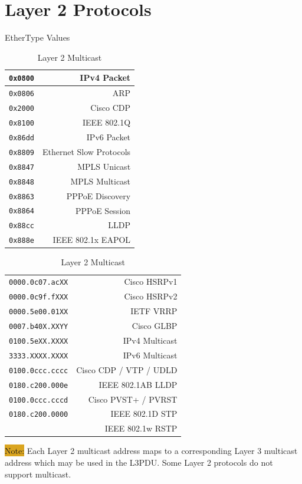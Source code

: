 \documentclass[12pt]{article}
\newcommand{\note}[1]{\colorbox{#1}{Note:}}
\begin{document}
\section{Layer 2 Protocols \label{sec:L2}}
	\begin{table}[H]
	\begin{minipage}{.4\linewidth}
	\centering
	\caption{EtherType Values \label{tab:ETHERTYPE}}
	\begin{tabular}{| c | r |}
	\hline
	\texttt{0x0800}	& IPv4 Packet\\\hline
	\texttt{0x0806}	& ARP\\\hline
	\texttt{0x2000}	& Cisco CDP\\\hline
	\texttt{0x8100}	& IEEE 802.1Q\\\hline
	\texttt{0x86dd}	& IPv6 Packet\\\hline
	\texttt{0x8809}	& Ethernet Slow Protocols\\\hline
	\texttt{0x8847}	& MPLS Unicast\\
	\texttt{0x8848}	& MPLS Multicast\\\hline
	\texttt{0x8863}	& PPPoE Discovery\\
	\texttt{0x8864}	& PPPoE Session\\\hline
	\texttt{0x88cc}	& LLDP\\\hline
	\texttt{0x888e}	& IEEE 802.1x EAPOL\\\hline
	\end{tabular}\end{minipage}\hfill
	\begin{minipage}{.6\linewidth}
	\centering
	\caption{Layer 2 Multicast \label{tab:MULTICAST L2}}
	\begin{tabular}{| l | r |}
	\hline
	\texttt{0000.0c07.acXX}		& Cisco HSRPv1\\
	\texttt{0000.0c9f.fXXX}		& Cisco HSRPv2\\\hline
	\texttt{0000.5e00.01XX} 		& IETF VRRP\\\hline
	\texttt{0007.b40X.XXYY}		& Cisco GLBP\\\hline
	\texttt{0100.5eXX.XXXX}		& IPv4 Multicast\\
	\texttt{3333.XXXX.XXXX}		& IPv6 Multicast\\\hline
	\texttt{0100.0ccc.cccc}	 	& Cisco CDP / VTP / UDLD\\\hline
	\texttt{0180.c200.000e}	 	& IEEE 802.1AB LLDP\\\hline
	\texttt{0100.0ccc.cccd}		& Cisco PVST+ / PVRST\\\hline
	\texttt{0180.c200.0000}	 	& IEEE 802.1D STP\\
						& IEEE 802.1w RSTP\\\hline
	\end{tabular}\end{minipage}\end{table}
	\note{Goldenrod} Each Layer 2 multicast address maps to a corresponding Layer 3 multicast address which may be used in the L3PDU. Some Layer 2 protocols do not support multicast.
\end{document}
